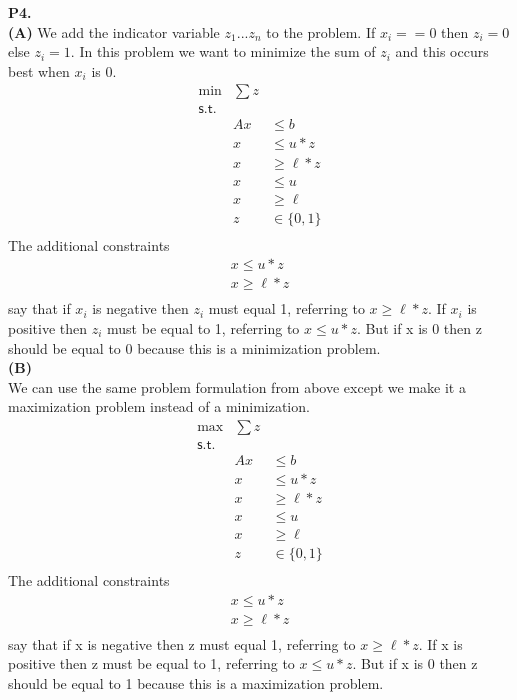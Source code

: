 \documentclass[11pt]{article}
\begin{document}
\medskip
\newpage
\noindent\textbf{P4.}
\\
\noindent\textbf{(A)}
We add the indicator variable $z_1...z_n$ to the problem.  If $x_i == 0$ then $z_i = 0$ else $z_i = 1$.  In this problem we want to minimize the sum of $z_i$ and this occurs best when $x_i$ is 0.
\[\begin{array}{rlllllllll}
\min & \sum z \\
\mathsf{s.t. } \\
& Ax & \leq b \\
& x & \leq u*z \\
& x & \geq \ell*z \\
& x & \leq u \\
& x & \geq \ell \\
& z & \in \{0,1\} \\
\end{array}\]
The additional constraints
\begin{align*}
x \leq u*z \\
x \geq \ell*z \\
\end{align*}
say that if $x_i$ is negative then $z_i$ must equal 1, referring to $x \geq \ell*z$.  If $x_i$ is positive then $z_i$ must be equal to 1, referring to $x\leq u*z$.  But if x is 0 then z should be equal to 0 because this is a minimization problem.
\\
\noindent\textbf{(B)}\\
We can use the same problem formulation from above except we make it a maximization problem instead of a minimization.
\[\begin{array}{rlllllllll}
\max & \sum z \\
\mathsf{s.t. } \\
& Ax & \leq b \\
& x & \leq u*z \\
& x & \geq \ell*z \\
& x & \leq u \\
& x & \geq \ell \\
& z & \in \{0,1\} \\
\end{array}\]
The additional constraints
\begin{align*}
x \leq u*z \\
x \geq \ell*z \\
\end{align*}
say that if x is negative then z must equal 1, referring to $x \geq \ell*z$.  If x is positive then z must be equal to 1, referring to $x\leq u*z$.  But if x is 0 then z should be equal to 1 because this is a maximization problem.
\end{document}
